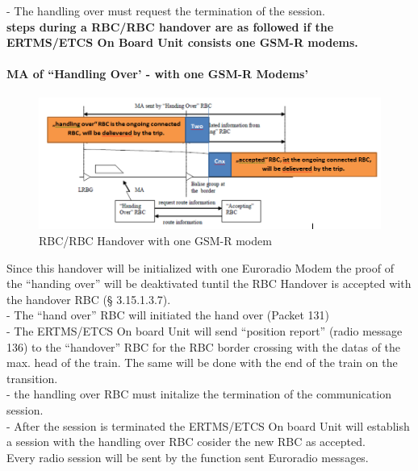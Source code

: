 \documentclass{template/openetcs_report}
\begin{document}
- The handling over must request the termination of the session.\\

\textbf{ steps during a RBC/RBC handover are as followed if the ERTMS/ETCS On Board Unit consists one GSM-R modems.}\\

\newpage

\paragraph{MA of ``Handling Over' - with one GSM-R Modems'}
\begin{figure}[hbtp]
\centering
\includegraphics [scale=0.5]{images//Handingover1GSMR}
\caption{RBC/RBC Handover with one GSM-R modem}
\end{figure}
\newpage


Since this handover will be initialized with one Euroradio Modem the proof of the ``handing over'' will be deaktivated tuntil the RBC Handover is accepted with the handover RBC (§ 3.15.1.3.7).\\

- The ``hand over'' RBC will initiated the hand over (Packet 131)\\

- The ERTMS/ETCS On board Unit will send ``position report'' (radio message 136) to the ``handover'' RBC for the RBC border crossing with the datas of the max. head of the train. The same will be done with the end of the train on the transition.\\

- the handling over RBC must initalize the termination of the communication session.\\

- After the session is terminated the ERTMS/ETCS On board Unit will establish a session with the handling over RBC cosider the new RBC as accepted.\\

Every radio session will be sent by the function sent Euroradio messages.\\
\end{document}
